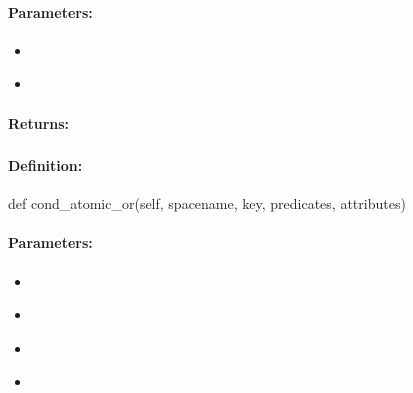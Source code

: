 \paragraph{Parameters:}
\begin{itemize}[noitemsep]
\item {}\\

\item {}\\

\end{itemize}

\paragraph{Returns:}


\pagebreak
\subsubsection{}
\label{api:python:cond_atomic_or}


\paragraph{Definition:}
\begin{pythoncode}
def cond_atomic_or(self, spacename, key, predicates, attributes)
\end{pythoncode}

\paragraph{Parameters:}
\begin{itemize}[noitemsep]
\item {}\\

\item {}\\

\item {}\\

\item {}\\

\end{itemize}


